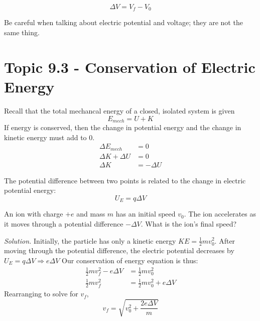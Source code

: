 \documentclass[12pt, titlepage]{article}
\begin{document}
\[\Delta V = V_f - V_0\]

Be careful when talking about electric potential and voltage; they are not the same thing.

\section*{Topic 9.3 - Conservation of Electric Energy}

Recall that the total mechancal energy of a closed, isolated system is given 
\begin{equation*}
    E_{mech} = U + K
\end{equation*}
If energy is conserved, then the change in potential energy and the change in kinetic energy must add to 0. 
\begin{equation*}
    \begin{split}
        \Delta E_{mech} &= 0 \\
        \Delta K + \Delta U &= 0 \\
        \Delta K &= -\Delta U
    \end{split}
\end{equation*}

The potential difference between two points is related to the change in electric potential energy:
\begin{equation*}
    U_E = q\Delta V
\end{equation*}

\begin{Problem}
    An ion with charge $+e$ and mass $m$ has an initial speed $v_0$. The ion accelerates as it moves through a potential difference $-\Delta V$. What is the ion’s final speed?

    \tcblower

    \textit{Solution. }Initially, the particle has only a kinetic energy $KE = \frac{1}{2}mv_0^2$. After moving through the potential difference, the electric potential decreases by $U_E = q\Delta V \Rightarrow e\Delta V$ Our conservation of energy equation is thus:
    \begin{equation*}
        \begin{split}
            \frac{1}{2}mv_f^2-e\Delta V & =\frac{1}{2}mv_0^2 \\
            \frac{1}{2}mv_f^2 & =\frac{1}{2}mv_0^2 + e\Delta V
        \end{split}
    \end{equation*}
    Rearranging to solve for $v_f$,
    \begin{equation*}
        v_f= \sqrt{v_0^2+\frac{2e\Delta V}{m}}
    \end{equation*}
\end{Problem}
\end{document}

